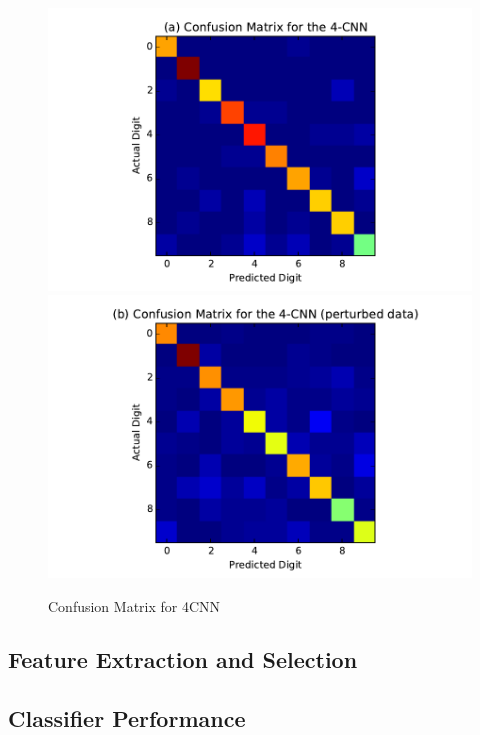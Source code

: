 \documentclass[conference]{IEEEtran}
\begin{document}
\begin{figure}[h]
	\label{4CNN_confusion}
	\centering
	\includegraphics[scale=0.5]{4CNN_confusion.pdf}
	\includegraphics[scale=0.5]{4CNN_perturbed_confusion.pdf}
	\caption{Confusion Matrix for 4CNN}
\end{figure}


\subsection{Feature Extraction and Selection}



\subsection{Classifier Performance}
\end{document}
